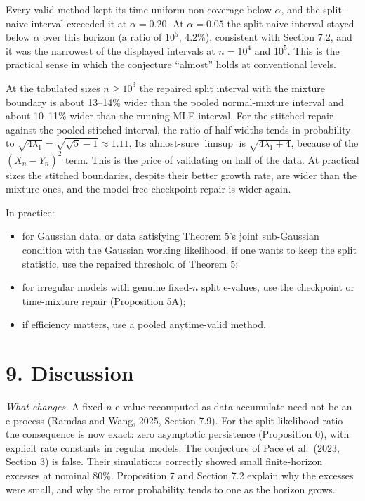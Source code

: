 \documentclass[
  10pt,
  a4paper,
]{article}
\providecommand{\tightlist}{%
  \setlength{\itemsep}{0pt}\setlength{\parskip}{0pt}}
\begin{document}
Every valid method kept its time-uniform non-coverage below \(\alpha\),
and the split-naive interval exceeded it at \(\alpha=0.20\). At
\(\alpha=0.05\) the split-naive interval stayed below \(\alpha\) over
this horizon (a ratio of \(10^5\), \(4.2\%\)), consistent with Section
7.2, and it was the narrowest of the displayed intervals at \(n=10^4\)
and \(10^5\). This is the practical sense in which the conjecture
``almost'' holds at conventional levels.

At the tabulated sizes \(n\ge10^3\) the repaired split interval with the
mixture boundary is about 13--14\% wider than the pooled normal-mixture
interval and about 10--11\% wider than the running-MLE interval. For the
stitched repair against the pooled stitched interval, the ratio of
half-widths tends in probability to
\(\sqrt{4\lambda_1}=\sqrt{\sqrt5-1}\approx1.11\). Its almost-sure
\(\limsup\) is \(\sqrt{4\lambda_1+4}\), because of the
\((\bar X_n-\bar Y_n)^2\) term. This is the price of validating on half
of the data. At practical sizes the stitched boundaries, despite their
better growth rate, are wider than the mixture ones, and the model-free
checkpoint repair is wider again.

In practice:

\begin{itemize}
\tightlist
\item
  for Gaussian data, or data satisfying Theorem 5's joint sub-Gaussian
  condition with the Gaussian working likelihood, if one wants to keep
  the split statistic, use the repaired threshold of Theorem 5;
\item
  for irregular models with genuine fixed-\(n\) split e-values, use the
  checkpoint or time-mixture repair (Proposition 5A);
\item
  if efficiency matters, use a pooled anytime-valid method.
\end{itemize}

\section{9. Discussion}\label{discussion}

\emph{What changes.} A fixed-\(n\) e-value recomputed as data accumulate
need not be an e-process (Ramdas and Wang, 2025, Section 7.9). For the
split likelihood ratio the consequence is now exact: zero asymptotic
persistence (Proposition 0), with explicit rate constants in regular
models. The conjecture of Pace et al.~(2023, Section 3) is false. Their
simulations correctly showed small finite-horizon excesses at nominal
\(80\%\). Proposition 7 and Section 7.2 explain why the excesses were
small, and why the error probability tends to one as the horizon grows.
\end{document}
